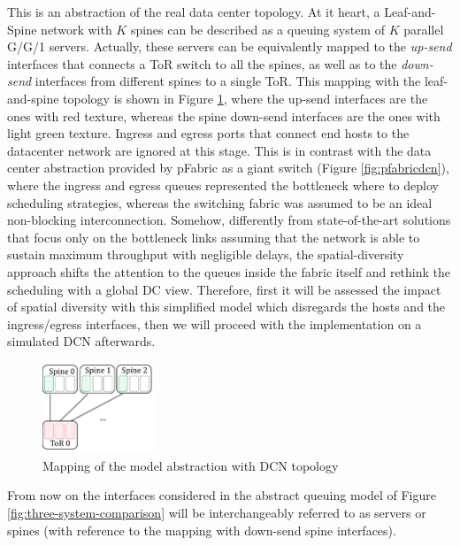 This is an abstraction of the real data center topology. At it heart, a Leaf-and-Spine network with $K$ spines can be described as a queuing system of $K$ parallel G/G/1 servers. Actually, these servers can be equivalently mapped to the \textit{up-send} interfaces that connects a ToR switch to all the spines, as well as to the \textit{down-send} interfaces from different spines to a single ToR. This mapping with the leaf-and-spine topology is shown in Figure \ref{fig:model-dc-map}, where the up-send interfaces are the ones with red texture, whereas the spine down-send interfaces are the ones with light green texture. Ingress and egress ports that connect end hosts to the datacenter network are ignored at this stage. This is in contrast with the data center abstraction provided by pFabric as a giant switch (Figure \ref{fig:pfabricdcn}), where the ingress and egress queues represented the bottleneck where to deploy scheduling strategies, whereas the switching fabric was assumed to be an ideal non-blocking interconnection. Somehow, differently from state-of-the-art solutions that focus only on the bottleneck links assuming that the network is able to sustain maximum throughput with negligible delays, the spatial-diversity approach shifts the attention to the queues inside the fabric itself and rethink the scheduling with a global DC view. Therefore, first it will be assessed the impact of spatial diversity with this simplified model which disregards the hosts and the ingress/egress interfaces, then we will proceed with the implementation on a simulated DCN afterwards.  \\
\begin{figure}
	\centering
	\includegraphics[width=0.3\textwidth]{ChapterSpatialDiversityFramework/Figures/model-dc-map}
	\caption{Mapping of the model abstraction with DCN topology}
	\label{fig:model-dc-map}
\end{figure}
From now on the interfaces considered in the abstract queuing model  of Figure \ref{fig:three-system-comparison} will be interchangeably referred to as servers or spines (with reference to the mapping with down-send spine interfaces).  

